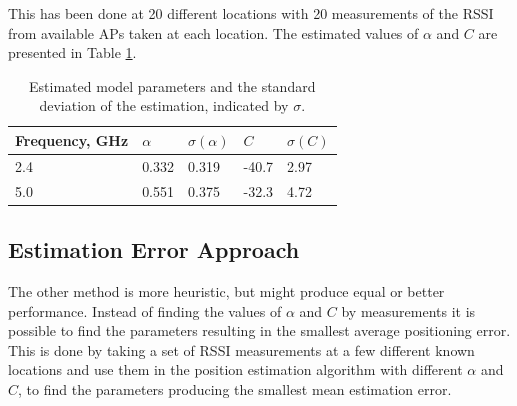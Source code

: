 \documentclass{LTHthesis}
\begin{document}
This has been done at 20 different locations with 20 measurements of the RSSI from available APs taken at each location. The estimated values of $\alpha$ and $C$ are presented in Table \ref{table:est_par}.

\begin{table}
\begin{center}
\begin{tabular}{|l|l|l|l|l|}
\hline
\multicolumn{1}{|c|}{Frequency, GHz} & $\alpha$ & $\sigma(\alpha)$ & $C$ & $\sigma(C)$ \\
\hline
\hline
2.4 & 0.332 & 0.319 & -40.7 & 2.97 \\
5.0 & 0.551 & 0.375 & -32.3 & 4.72  \\
\hline
\end{tabular}
\end{center}
\caption{Estimated model parameters and the standard deviation of the estimation, indicated by $\sigma$.}\label{table:est_par}
\end{table}
%
\subsection{Estimation Error Approach}
The other method is more heuristic, but might produce equal or better performance. Instead of finding the values of $\alpha$ and $C$ by measurements it is possible to find the parameters resulting in the smallest average positioning error. This is done by taking a set of RSSI measurements at a few different known locations and use them in the position estimation algorithm with different $\alpha$ and $C$, to find the parameters producing the smallest mean estimation error.   
\end{document}
